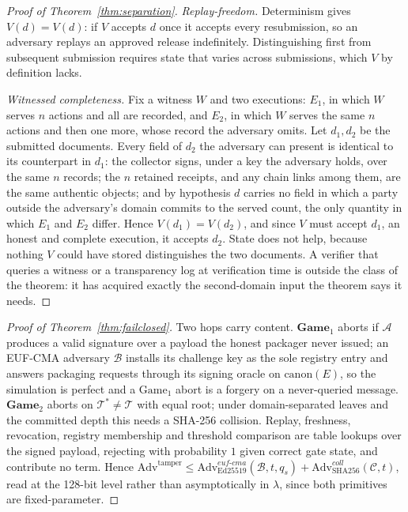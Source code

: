 \documentclass[letterpaper,10pt,twocolumn]{article}
\theoremstyle{definition}
\begin{document}
\begin{proof}[Proof of Theorem~\ref{thm:separation}]
\emph{Replay-freedom.} Determinism gives $V(d)=V(d)$: if $V$ accepts $d$ once it accepts every resubmission, so an adversary replays an approved release indefinitely. Distinguishing first from subsequent submission requires state that varies across submissions, which $V$ by definition lacks.

\emph{Witnessed completeness.} Fix a witness $W$ and two executions: $E_1$, in which $W$ serves $n$ actions and all are recorded, and $E_2$, in which $W$ serves the same $n$ actions and then one more, whose record the adversary omits. Let $d_1, d_2$ be the submitted documents. Every field of $d_2$ the adversary can present is identical to its counterpart in $d_1$: the collector signs, under a key the adversary holds, over the same $n$ records; the $n$ retained receipts, and any chain links among them, are the same authentic objects; and by hypothesis $d$ carries no field in which a party outside the adversary's domain commits to the served count, the only quantity in which $E_1$ and $E_2$ differ. Hence $V(d_1)=V(d_2)$, and since $V$ must accept $d_1$, an honest and complete execution, it accepts $d_2$. State does not help, because nothing $V$ could have stored distinguishes the two documents. A verifier that queries a witness or a transparency log at verification time is outside the class of the theorem: it has acquired exactly the second-domain input the theorem says it needs.
\end{proof}

\begin{proof}[Proof of Theorem~\ref{thm:failclosed}]
Two hops carry content. $\mathbf{Game}_1$ aborts if $\mathcal{A}$ produces a valid signature over a payload the honest packager never issued; an EUF-CMA adversary $\mathcal{B}$ installs its challenge key as the sole registry entry and answers packaging requests through its signing oracle on $\mathrm{canon}(E)$, so the simulation is perfect and a $\text{Game}_1$ abort is a forgery on a never-queried message. $\mathbf{Game}_2$ aborts on $\mathcal{T}^*\neq\mathcal{T}$ with equal root; under domain-separated leaves and the committed depth this needs a SHA-256 collision. Replay, freshness, revocation, registry membership and threshold comparison are table lookups over the signed payload, rejecting with probability $1$ given correct gate state, and contribute no term. Hence $\mathrm{Adv}^{\text{tamper}} \le \mathrm{Adv}^{euf\text{-}cma}_{\mathrm{Ed25519}}(\mathcal{B},t,q_s) + \mathrm{Adv}^{coll}_{\mathrm{SHA256}}(\mathcal{C},t)$, read at the 128-bit level rather than asymptotically in $\lambda$, since both primitives are fixed-parameter.
\end{proof}
\end{document}
